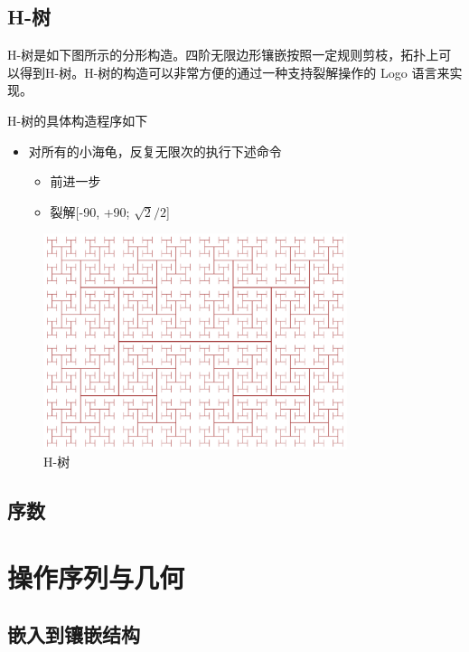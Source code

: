 \documentclass[a4paper,12pt]{article}
\begin{document}
\newpage

\subsection{H-树}

H-树是如下图所示的分形构造。四阶无限边形镶嵌按照一定规则剪枝，拓扑上可以得到H-树。H-树的构造可以非常方便的通过一种支持裂解操作的 Logo 语言来实现。

H-树的具体构造程序如下

\begin{itemize}
\item 对所有的小海龟，反复无限次的执行下述命令
\begin{itemize}\item 前进一步 \item 裂解[-90, +90; $\sqrt{2} / 2$] \end{itemize}
\end{itemize}

\begin{figure}[ht]
\centering
\includegraphics[width=3.5in]{images/2000px-H_tree.png}
\caption{H-树}
\end{figure}

\newpage


\subsection{序数}

\newpage

\section{操作序列与几何}

\subsection{嵌入到镶嵌结构}
\end{document}
